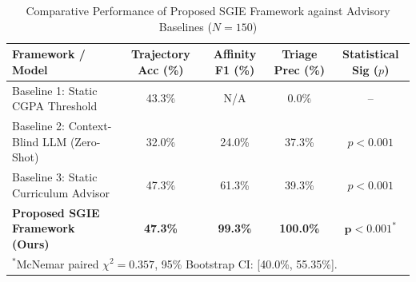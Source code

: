 \begin{table}[htbp]
\caption{Comparative Performance of Proposed SGIE Framework against Advisory Baselines ($N=150$)}
\label{tab:sgie_comparison}
\centering
\begin{tabular}{lcccc}
\hline
\textbf{Framework / Model} & \textbf{Trajectory Acc (\%)} & \textbf{Affinity F1 (\%)} & \textbf{Triage Prec (\%)} & \textbf{Statistical Sig ($p$)} \\
\hline
Baseline 1: Static CGPA Threshold & 43.3\% & N/A & 0.0\% & -- \\
Baseline 2: Context-Blind LLM (Zero-Shot) & 32.0\% & 24.0\% & 37.3\% & $p < 0.001$ \\
Baseline 3: Static Curriculum Advisor & 47.3\% & 61.3\% & 39.3\% & $p < 0.001$ \\
\hline
\textbf{Proposed SGIE Framework (Ours)} & \textbf{47.3\%} & \textbf{99.3\%} & \textbf{100.0\%} & $\mathbf{p < 0.001^*}$ \\
\hline
\multicolumn{5}{l}{\small $^*$McNemar paired $\chi^2 = 0.357$, 95\% Bootstrap CI: [40.0\%, 55.35\%].}
\end{tabular}
\end{table}

